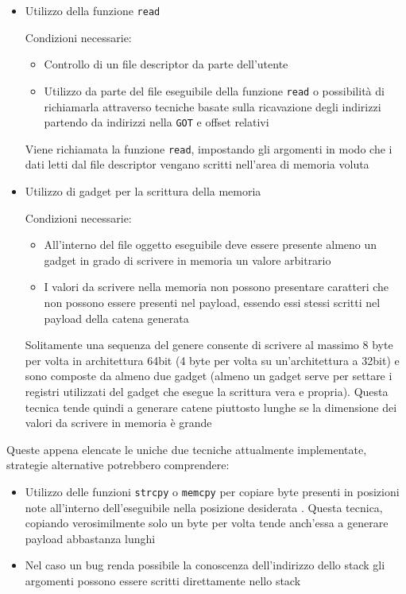 \begin{itemize}

\item  Utilizzo della funzione \lstinline{read}

  Condizioni necessarie: 
  \begin{itemize}
   \item Controllo di un file descriptor da parte dell'utente
   \item Utilizzo da parte del file eseguibile della funzione
     \lstinline{read} o possibilità di richiamarla attraverso tecniche
     basate sulla ricavazione degli indirizzi partendo da indirizzi
     nella \lstinline{GOT} e offset relativi
  \end{itemize}

  Viene richiamata la funzione \lstinline{read}, impostando gli
  argomenti in modo che i dati letti dal file descriptor vengano
  scritti nell'area di memoria voluta

\item Utilizzo di gadget per la scrittura della memoria

  Condizioni necessarie:
  \begin{itemize}

    \item All'interno del file oggetto eseguibile deve essere presente
      almeno un gadget in grado di scrivere in memoria un valore
      arbitrario

    \item I valori da scrivere nella memoria non possono presentare
      caratteri che non possono essere presenti nel payload, essendo
      essi stessi scritti nel payload della catena generata

  \end{itemize}
  Solitamente una sequenza del genere consente di scrivere al massimo
  8 byte per volta in architettura 64bit (4 byte per volta su
  un'architettura a 32bit) e sono composte da almeno due gadget
  (almeno un gadget serve per settare i registri utilizzati del gadget
  che esegue la scrittura vera e propria). Questa tecnica tende quindi
  a generare catene piuttosto lunghe se la dimensione dei valori da
  scrivere in memoria è grande

\end{itemize}

Queste appena elencate le uniche due tecniche attualmente implementate,
strategie alternative potrebbero comprendere:

\begin{itemize}

\item Utilizzo delle funzioni \lstinline{strcpy} o \lstinline{memcpy}
  per copiare byte presenti in posizioni note all'interno
  dell'eseguibile nella posizione desiderata
  \cite{roglia:2009}. Questa tecnica, copiando verosimilmente solo un
  byte per volta tende anch'essa a generare payload abbastanza lunghi

\item Nel caso un bug renda possibile la conoscenza dell'indirizzo
  dello stack gli argomenti possono essere scritti direttamente nello
  stack

\end{itemize}

